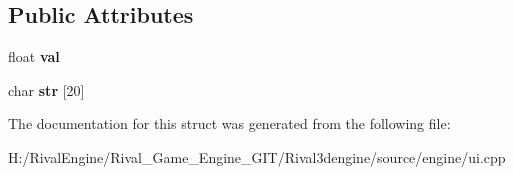 \subsection*{Public Attributes}
\begin{DoxyCompactItemize}
\item 
\mbox{\label{struct_u_i_1_1_text_float_a946d1d914c48b5443b223d6a4546bd0f}} 
float {\bfseries val}
\item 
\mbox{\label{struct_u_i_1_1_text_float_a958aa183aba79da64a85cb73fccab96b}} 
char {\bfseries str} \mbox{[}20\mbox{]}
\end{DoxyCompactItemize}


The documentation for this struct was generated from the following file\+:\begin{DoxyCompactItemize}
\item 
H\+:/\+Rival\+Engine/\+Rival\+\_\+\+Game\+\_\+\+Engine\+\_\+\+G\+I\+T/\+Rival3dengine/source/engine/ui.\+cpp\end{DoxyCompactItemize}
